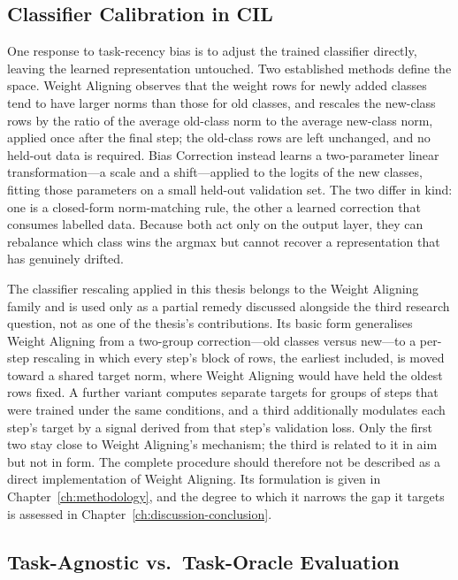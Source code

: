 \subsection{Classifier Calibration in CIL}
\label{sec:calibration}

One response to task-recency bias is to adjust the trained classifier
directly, leaving the learned representation untouched. Two established
methods define the space. Weight Aligning \parencite{zhao2020maintaining} observes that
the weight rows for newly added classes tend to have larger norms than
those for old classes, and rescales the new-class rows by the ratio of the
average old-class norm to the average new-class norm, applied once after
the final step; the old-class rows are left unchanged, and no held-out data
is required. Bias Correction \parencite{wu2019large} instead learns a
two-parameter linear transformation---a scale and a shift---applied to the
logits of the new classes, fitting those parameters on a small held-out
validation set. The two differ in kind: one is a closed-form norm-matching
rule, the other a learned correction that consumes labelled data. Because
both act only on the output layer, they can rebalance which class wins the
argmax but cannot recover a representation that has genuinely drifted.

The classifier rescaling applied in this thesis belongs to the Weight
Aligning family and is used only as a partial remedy discussed alongside the third
research question, not as one of the thesis's contributions. Its basic form
generalises Weight Aligning from a two-group correction---old classes
versus new---to a per-step rescaling in which every step's block of rows,
the earliest included, is moved toward a shared target norm, where Weight
Aligning would have held the oldest rows fixed. A further variant computes
separate targets for groups of steps that were trained under the same
conditions, and a third additionally modulates each step's target by a
signal derived from that step's validation loss. Only the first two stay
close to Weight Aligning's mechanism; the third is related to it in aim but
not in form. The complete procedure should therefore not be described as a
direct implementation of Weight Aligning. Its formulation is given in
Chapter~\ref{ch:methodology}, and the degree to which it narrows the gap it targets is
assessed in Chapter~\ref{ch:discussion-conclusion}.

\subsection{Task-Agnostic vs.\ Task-Oracle Evaluation}
\label{sec:open-restricted}

